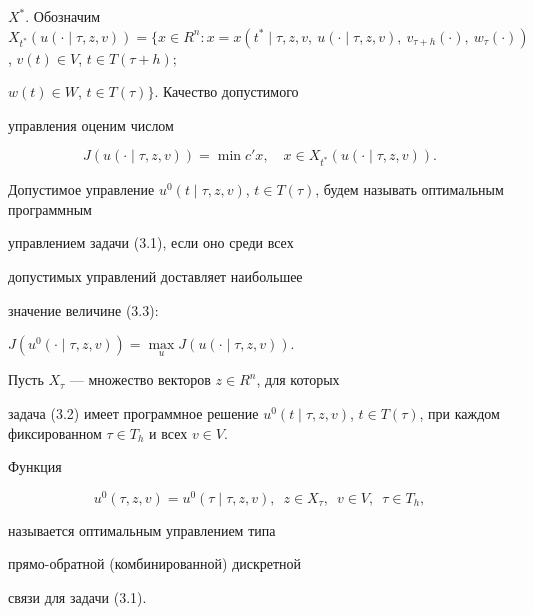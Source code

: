$X^*$. Обозначим $X_{t^*}(u(\cdot\mid\tau,z,v))=\{x \in


R^n:x=x(t^*\mid\tau,z,v,\ u(\cdot\mid\tau,z,v),


\ v_{\tau+h}(\cdot),\ w_{\tau}(\cdot))$, $v(t) \in V$, $t \in T(\tau+h)$;


$w(t) \in W$, $t \in T(\tau)\}$. Качество допустимого


управления оценим числом


\begin{equation}


J(u(\cdot\mid\tau,z,v))=\min c'x,\quad x \in X_{t^*}(u(\cdot\mid\tau,z,v)).


\end{equation}





Допустимое управление $u^0(t\mid\tau,z,v)$, $t \in


T(\tau)$, будем называть оптимальным программным


управлением задачи (3.1), если оно среди всех


допустимых управлений доставляет наибольшее


значение величине (3.3):


$J(u^0(\cdot\mid\tau,z,v))=\max\limits_{u}J(u(\cdot\mid\tau,z,v))$.





Пусть $X_{\tau}$ --- множество векторов $z \in R^n$, для которых


задача (3.2) имеет программное решение $u^0(t\mid\tau,z,v)$, $t \in


T(\tau)$, при каждом фиксированном $\tau \in T_h$ и всех $v \in V$.





\begin{defns}


Функция


\begin{equation}


u^0(\tau,z,v)=u^0(\tau\mid\tau,z,v),\ \; z \in X_{\tau},\ \; v \in V,


\ \;\tau \in T_{h},


\end{equation}


называется оптимальным управлением типа


прямо-обратной (комбинированной) дискретной


связи для задачи (3.1).


\end{defns}





